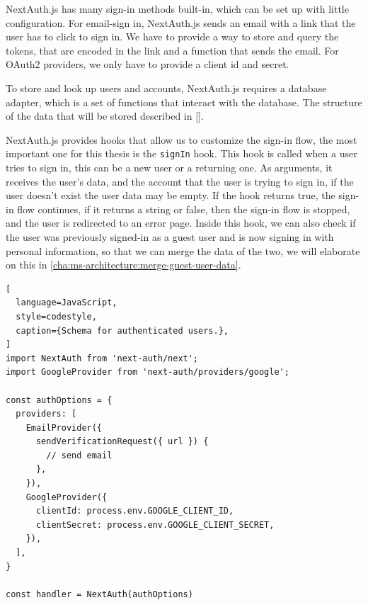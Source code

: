 NextAuth.js has many sign-in methods built-in, which can be set up with little configuration.
For email-sign in, NextAuth.js sends an email with a link that the user has to click to
sign in.
We have to provide a way to store and query the tokens, that are encoded in the link and a
function that sends the email.
For OAuth2 providers, we only have to provide a client id and secret.

To store and look up users and accounts, NextAuth.js requires a database adapter,
which is a set of functions that interact with the database.
The structure of the data that will be stored described in \ref{}.

NextAuth.js provides hooks that allow us to customize the sign-in flow, the most important
one for this thesis is the \lstinline{signIn} hook.
This hook is called when a user tries to sign in, this can be a new user or a returning
one.
As arguments, it receives the user's data, and the account that the user is trying to sign
in, if the user doesn't exist the user data may be empty.
If the hook returns true, the sign-in flow continues, if it returns a string or false,
then the sign-in flow is stopped, and the user is redirected to an error page.
Inside this hook, we can also check if the user was previously signed-in as a guest user
and is now signing in with personal information, so that we can merge the data of the two,
we will elaborate on this in \ref{cha:ms-architecture:merge-guest-user-data}.


\begin{lstlisting}[
  language=JavaScript,
  style=codestyle,
  caption={Schema for authenticated users.},
]
import NextAuth from 'next-auth/next';
import GoogleProvider from 'next-auth/providers/google';

const authOptions = {
  providers: [
    EmailProvider({
      sendVerificationRequest({ url }) {
        // send email
      },
    }),
    GoogleProvider({
      clientId: process.env.GOOGLE_CLIENT_ID,
      clientSecret: process.env.GOOGLE_CLIENT_SECRET,
    }),
  ],
}

const handler = NextAuth(authOptions)
\end{lstlisting}


%
%


